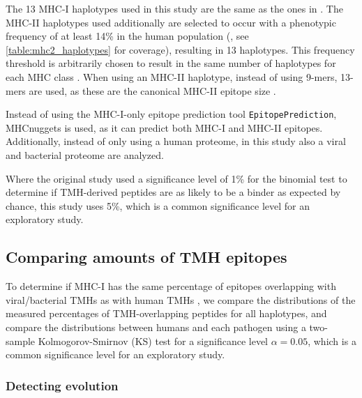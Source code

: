 The 13 MHC-I haplotypes used in this study are the same as 
the ones in \cite{bianchi2017}.
The MHC-II haplotypes used additionally are selected 
to occur with a phenotypic frequency of at least 14\% in
the human population (\cite{greenbaum2011functional},
see \ref{table:mhc2_haplotypes} for coverage),
resulting in 13 haplotypes.
This frequency threshold is arbitrarily chosen to result in 
the same number of haplotypes for each MHC class
.
When using an MHC-II haplotype, instead of using 9-mers, 13-mers are
used, as these are the canonical MHC-II epitope size .

Instead of using the MHC-I-only epitope prediction 
tool \verb;EpitopePrediction;, MHCnuggets is used, as it can predict
both MHC-I and MHC-II epitopes.
Additionally, instead of only using a human proteome, in this study
also a viral and bacterial proteome are analyzed.

Where the original study used a significance level of 1\% 
for the binomial test to determine if TMH-derived peptides 
are as likely to be a binder as expected by chance, this study
uses 5\%, which is a common significance level for an exploratory study.

\subsection{Comparing amounts of TMH epitopes}

To determine if MHC-I has the same percentage of epitopes overlapping
with viral/bacterial TMHs as with human TMHs , 
we compare the distributions of the measured percentages 
of TMH-overlapping peptides for all haplotypes,
and compare the distributions between humans and each pathogen
using a two-sample Kolmogorov-Smirnov (KS) test
for a significance level $\alpha = 0.05$, 
which is a common significance level for an exploratory study.

\subsubsection{Detecting evolution}

